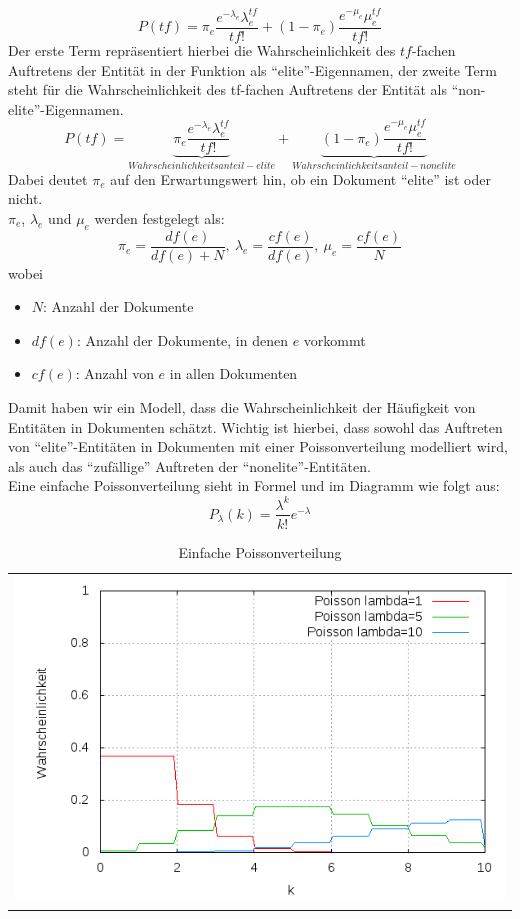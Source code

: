 \begin{equation}
P\left( tf \right)=\pi_e\frac{e^{-\lambda_e}\lambda_{e}^{ tf }}{tf!}+\left( 1-\pi_e \right)\frac{e^{-\mu_e} \mu_e^{tf}}{tf!}
\end{equation}
Der erste Term repräsentiert hierbei die Wahrscheinlichkeit des $tf$-fachen Auftretens der Entität in der Funktion als ``elite''-Eigennamen, der zweite Term steht für die Wahrscheinlichkeit des tf-fachen Auftretens der Entität als ``non-elite''-Eigennamen.
\[P\left( tf \right)=\underbrace{\pi_e\frac{e^{-\lambda_e}\lambda_{e}^{ tf }}{tf!}}_{Wahrscheinlichkeitsanteil - elite} +\underbrace{\left( 1-\pi_e \right)\frac{e^{-\mu_e} \mu_e^{tf}}{tf!}}_{Wahrscheinlichkeitsanteil - nonelite}\]
Dabei deutet $\pi_e$ auf den Erwartungswert hin, ob ein Dokument ``elite'' ist oder nicht.\\
$\pi_e$, $\lambda_e$ und $\mu_e$ werden festgelegt als:
\[\pi_e=\frac{df\left( e \right)}{df\left( e \right)+N}, \ \lambda_e=\frac{cf\left( e \right)}{df\left( e \right)}, \ \mu_e=\frac{cf(e)}{N}\]
wobei
\begin{itemize}
	
	\item $N$: Anzahl der Dokumente
	\item $df(e)$: Anzahl der Dokumente, in denen $e$ vorkommt
	\item $cf(e)$: Anzahl von $e$ in allen Dokumenten
\end{itemize}
Damit haben wir ein Modell, dass die Wahrscheinlichkeit der Häufigkeit von Entitäten in Dokumenten schätzt. Wichtig ist hierbei, dass sowohl das Auftreten von ``elite''-Entitäten in Dokumenten mit einer Poissonverteilung modelliert wird, als auch das ``zufällige'' Auftreten der ``nonelite''-Entitäten.\\
Eine einfache Poissonverteilung sieht in Formel und im Diagramm wie folgt aus:
\[P_\lambda(k)=\frac{\lambda^k}{k!}e^{-\lambda}\]
\begin{table}[h]
	\centering
	\begin{tabular}{c}
		\includegraphics[scale=0.5]{pics/poisson_basic}
	\end{tabular}
	\caption{Einfache Poissonverteilung}
	\label{tab:poisson_basic}
\end{table}

